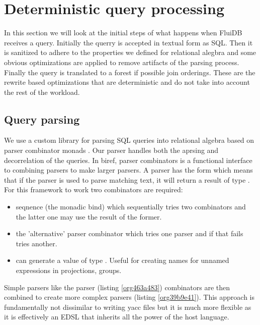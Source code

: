 \section{Deterministic query processing}
\label{sec:orgb65466e}
In this section we will look at the initial steps of what happens when
FluiDB receives a query. Initially the querry is accepted in textual
form as SQL. Then it is sanitized to adhere to the properties we
defined for relational alegbra and some obvious optimizations are
applied to remove artifacts of the parsing process. Finally the query
is translated to a forest if possible join orderings. These are the
rewrite based optimizations that are deterministic and do not take
into account the rest of the workload.

\subsection{Query parsing}
\label{sec:org860b230}
We use a custom library for parsing SQL queries into relational
algebra based on parser combinator monads
\cite{leijenParsecDirectStyle}. Our parser handles both the aprsing and
decorrelation of the queries. In biref, parser combinators is a
functional interface to combining parsers to make larger parsers. A
parser  has the form  which means that if the parser is used
to parse matching text, it will return a result of type . For this
framework to work two combinators are required:

\begin{itemize}
\item seqnence (the monadic bind) 
  which sequentially tries two combinators and the latter one may use
  the result of the former.
\item the 'alternative' parser combinator  which
  tries one parser and if that fails tries another.
\item {} can generate a value of type . Useful for creating
  names for unnamed expressions in projections, groups.
\end{itemize}

Simple parsers like the  parser (listing \ref{org463a483})
combinators are then combined to create more complex parsers (listing
\ref{org39b9e41}). This approach is fundamentally not dissimilar to
writing yacc files but it is much more flexible as it is effectively
an EDSL that inherits all the power of the host language.

